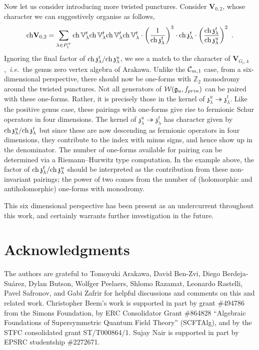 \documentclass[a4paper]{article}
\def\IV{\mathbb{V}}
\def\CC{{\cal C}}
\def\WW{{\cal W}}
\def\ch{{\rm ch}}
\def\gf{\mathfrak{g}}
\def \zf{\mathfrak{z}}
\def \ie{{\it i.e.}}
\def\V{\mathbf{V}}
\begin{document}
Now let us consider introducing more twisted punctures. Consider $\V_{0,2}$, whose character we can suggestively organise as follows,
\begin{equation}
	\ch \V_{0,2} = \sum_{\lambda \in P_t^+} \ch \,\IV_\lambda^t \ch \,\IV_\lambda^t\ch \,\IV_\lambda^t\ch \,\IV_\lambda^t \cdot \left( \frac{1}{\ch\, \zf_\lambda^t} \right)^3 \cdot \ch\, \zf_\lambda^t \cdot \left( \frac{ \ch\,\zf^t_\lambda}{\ch\,\zf^u_\lambda} \right)^2~.
\end{equation}
Ignoring the final factor of $\ch\, \zf^t_\lambda/\ch\,\zf_\lambda^u$, we see a match to the character of $\V_{G_t,4}$,~\ie\ the genus zero vertex algebra of Arakawa. Unlike the $\CC_{m,1}$ case, from a six-dimensional perspective, there should now be one-forms with $\mathbb{Z}_2$ monodromy around the twisted punctures. Not all generators of $\WW(\gf_u,f_{prin})$ can be paired with these one-forms. Rather, it is precisely those in the kernel of $\zf_{\lambda}^u\twoheadrightarrow \zf_{\lambda}^t$. Like the positive genus case, these pairings with one-forms give rise to fermionic Schur operators in four dimensions. The kernel of $\zf^u_{\lambda}\twoheadrightarrow \zf^t_{\lambda}$ has character given by $\ch\,\zf_\lambda^u/\ch\,\zf_\lambda^t$ but since these are now descending as fermionic operators in four dimensions, they contribute to the index with minus signs, and hence show up in the denominator. The number of one-forms available for pairing can be determined via a Riemann--Hurwitz type computation. In the example above, the factor of $\ch\,\zf_\lambda^t/\ch\,\zf_\lambda^u$ should be interpreted as the contribution from these non-invariant pairings; the power of two comes from the number of (holomorphic and antiholomorphic) one-forms with monodromy.

This six dimensional perspective has been present as an undercurrent throughout this work, and certainly warrants further investigation in the future.


\section*{Acknowledgments}
The authors are grateful to
Tomoyuki Arakawa,
David Ben-Zvi,
Diego Berdeja-Su\'arez,
Dylan Butson,
Wolfger Peelaers,
Shlomo Razamat,
Leonardo Rastelli,
Pavel Safronov,
and Gabi Zafrir
for helpful discussions and comments on this and related work. Christopher Beem's work is supported in part by grant \#494786 from the Simons Foundation, by ERC Consolidator Grant \#864828 ``Algebraic Foundations of Supersymmetric Quantum Field Theory'' (SCFTAlg), and by the STFC consolidated grant ST/T000864/1. Sujay Nair is supported in part by EPSRC studentship \#2272671.
\appendix
\end{document}
